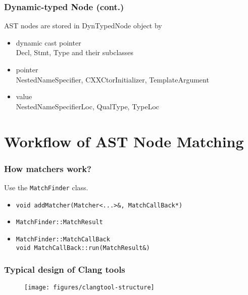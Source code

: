 \documentclass[]{beamer}
\begin{document}
\begin{frame}
  \frametitle{Dynamic-typed Node (cont.)}
  AST nodes are stored in \alert{DynTypedNode} object by
  \begin{itemize}
    \item dynamic cast pointer\\
      Decl, Stmt, Type and their subclasses
    \item pointer\\
      NestedNameSpecifier, CXXCtorInitializer, TemplateArgument
    \item value\\
      NestedNameSpecifierLoc, QualType, TypeLoc
  \end{itemize}
\end{frame}

\section{Workflow of AST Node Matching}
\frame{\tableofcontents[currentsection]}

\begin{frame}
  \frametitle{How matchers work?}
  Use the \texttt{MatchFinder} class.
  \begin{itemize}
    \item \texttt{void addMatcher(Matcher<...>\&, MatchCallBack*)}\\
    \item \texttt{MatchFinder::MatchResult}\\
    \item \texttt{MatchFinder::MatchCallBack}\\
      \texttt{void MatchCallBack::run(MatchResult\&)}\\
  \end{itemize}
\end{frame}

\begin{frame}
  \frametitle{Typical design of Clang tools}
  \begin{figure}
    \texttt{[image: figures/clangtool-structure]}
  \end{figure}
\end{frame}
\end{document}
